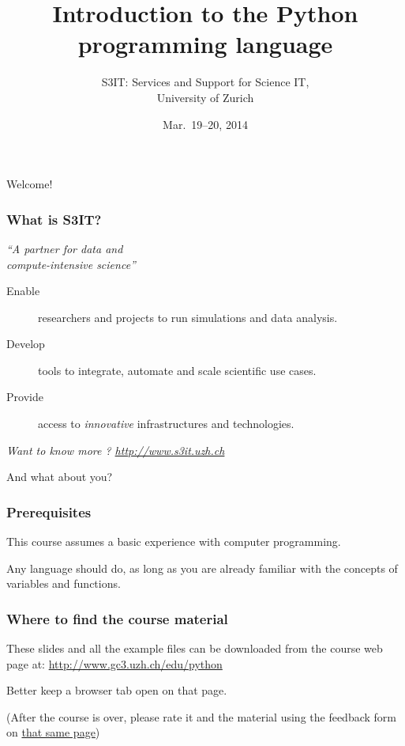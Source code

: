\documentclass[english,serif,mathserif,xcolor=pdftex,dvipsnames,table]{beamer}
\title[Introduction]{%
  Introduction to the Python programming language
}
\author[S3IT]{%
  S3IT: Services and Support for Science IT, \\
  University of Zurich
}
\date{Mar.~19--20, 2014}
\begin{document}
\maketitle

\begin{frame}
  \begin{center}
    {\Huge Welcome!}
  \end{center}
\end{frame}


\begin{frame}
  \frametitle{What is S3IT?}

  \begin{center}
    {\em ``A partner for data and \\ compute-intensive science''}

    \+
    \begin{description}
    \item[Enable] researchers and projects to run simulations and data analysis.
    \item[Develop] tools to integrate, automate and scale scientific use cases.
    \item[Provide] access to {\em innovative} infrastructures and technologies.
    \end{description}

    \+
    {\em \small{Want to know more ? }\url{http://www.s3it.uzh.ch}}
  \end{center}
\end{frame}


\begin{frame}
  \begin{center}
    {\Huge And what about you?}
  \end{center}
\end{frame}


\begin{frame}
  \frametitle{Prerequisites}
  This course assumes a basic experience with computer programming.

  \+
  Any language should do, as long as you are already familiar with
  the concepts of variables and functions.
\end{frame}


\begin{frame}
  \frametitle{Where to find the course material}

  These slides and all the example files can be downloaded from the
  course web page at:
  {\small\url{http://www.gc3.uzh.ch/edu/python}}

  \+
  Better keep a browser tab open on that page.

  \+
  (After the course is over, please rate it and the material using
  the feedback form on \href{http://www.gc3.uzh.ch/edu/python}{that
    same page})
\end{frame}
\end{document}
